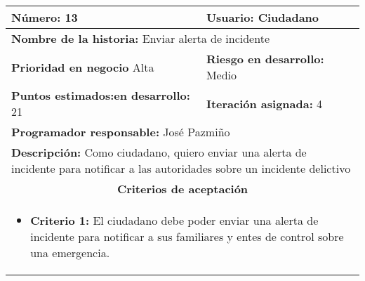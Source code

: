 \begin{longtable}{|p{6.7cm}|p{6.7cm}|}
    \textbf{Número:} 13                                  & \textbf{Usuario:} Ciudadano                                                                                      \\
    \hline
    \multicolumn{2}{|l|}{\textbf{Nombre de la historia:} Enviar alerta de incidente}                                                                                        \\
    \hline
    \textbf{Prioridad en negocio}  Alta                  & \textbf{Riesgo en desarrollo:} Medio                                                                             \\
    \hline
    \textbf{\textbf{Puntos estimados:}en desarrollo:} 21 & \textbf{Iteración asignada:} 4                                                                                   \\
    \hline
    \multicolumn{2}{|l|}{\textbf{Programador responsable:} José Pazmiño }                                                                                                   \\
    \hline
    \multicolumn{2}{|p{13.4cm}|}{\textbf{Descripción:} Como ciudadano, quiero enviar una alerta de incidente para notificar a las autoridades sobre un incidente delictivo} \\
    \hline
    \multicolumn{2}{|c|}{\textbf{Criterios de aceptación}}                                                                                                                  \\
    \hline
    \multicolumn{2}{|p{13.4cm}|}{
    \begin{itemize}[label={},leftmargin=*, nosep]
        \item \textbf{Criterio 1:} El ciudadano debe poder enviar una alerta de incidente para notificar a sus familiares y entes de control sobre una emergencia.
    \end{itemize}
    }                                                                                                                                                                       \\
\end{longtable}



